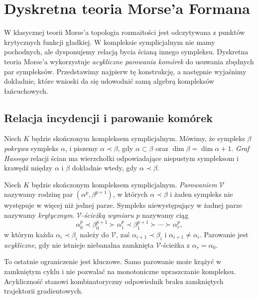 \chapter{Dyskretna teoria Morse'a Formana}
\label{ch:tg-forman}

W klasycznej teorii Morse'a topologia rozmaitości jest
odczytywana z punktów krytycznych funkcji gładkiej.
W kompleksie symplicjalnym nie mamy pochodnych,
ale dysponujemy relacją bycia ścianą innego sympleksu.
Dyskretna teoria Morse'a wykorzystuje \emph{acykliczne
parowania komórek} do usuwania zbędnych par sympleksów.
Przedstawimy najpierw tę konstrukcję, a następnie
wyjaśnimy dokładnie, które wnioski da się udowodnić
samą algebrą kompleksów łańcuchowych.

\section{Relacja incydencji i parowanie komórek}
\label{sec:tg-forman-matching}

\begin{definicja}
Niech $K$ będzie skończonym kompleksem symplicjalnym.
Mówimy, że sympleks $\beta$ \emph{pokrywa} sympleks
$\alpha$, i piszemy $\alpha\prec\beta$, gdy
$\alpha\subset\beta$ oraz
$\dim\beta=\dim\alpha+1$. \emph{Graf Hassego}
relacji ścian ma wierzchołki odpowiadające niepustym
sympleksom i krawędź między $\alpha$ i $\beta$
dokładnie wtedy, gdy $\alpha\prec\beta$.
\end{definicja}

\begin{definicja}
\label{def:tg-discrete-morse-field}
Niech $K$ będzie skończonym kompleksem symplicjalnym.
\emph{Parowaniem} $\mathcal V$ nazywamy rodzinę par
$(\alpha^p,\beta^{p+1})$, w których
$\alpha\prec\beta$ i żaden sympleks nie występuje
w więcej niż jednej parze. Sympleks niewystępujący
w żadnej parze nazywamy \emph{krytycznym}.
\emph{$\mathcal V$-ścieżką wymiaru $p$} nazywamy ciąg
\[
\alpha_0^p\prec\beta_0^{p+1}\succ\alpha_1^p
\prec\beta_1^{p+1}\succ\cdots\succ\alpha_r^p,
\]
w którym każda $\alpha_i\prec\beta_i$ należy do
$\mathcal V$, zaś $\alpha_{i+1}\prec\beta_i$ i
$\alpha_{i+1}\ne\alpha_i$. Parowanie jest
\emph{acykliczne}, gdy nie istnieje niebanalna
zamknięta $\mathcal V$-ścieżka z
$\alpha_r=\alpha_0$.
\end{definicja}

To ostatnie ograniczenie jest kluczowe. Samo parowanie
może krążyć w zamkniętym cyklu i nie pozwalać na
monotoniczne upraszczanie kompleksu. Acykliczność
stanowi kombinatoryczny odpowiednik braku zamkniętych
trajektorii gradientowych.

